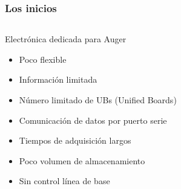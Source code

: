 \documentclass{beamer}
\begin{document}
\begin{frame}
	\frametitle{Los inicios}
		\begin{columns}
			\begin{column}{0.50\textwidth}
				\begin{block}{Electrónica dedicada para Auger}
		    	\begin{itemize}
		      	\item Poco flexible 
		      	\item Información limitada
		      	\item Número limitado de UBs (\alert{Unified Boards})
						\item Comunicación de datos por puerto serie
						\item	Tiempos de adquisición largos
						\item	Poco volumen de almacenamiento
						\item Sin control línea de base	
		    	\end{itemize}
				\end{block}
			\end{column} 
		 	\begin{column}{0.50\textwidth}
		 \end{column}
		\end{columns}
\end{frame} 
\end{document}

